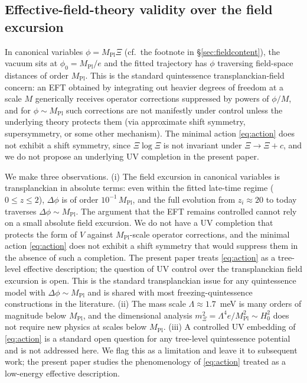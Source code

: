 \documentclass[11pt,reqno]{amsart}
\theoremstyle{plain}
\theoremstyle{definition}
\theoremstyle{remark}
\newcommand{\Pl}{\mathrm{Pl}}
\begin{document}
\subsection{Effective-field-theory validity over the field
excursion}\label{sec:eft}

In canonical variables $\phi = M_\Pl \Xi$ (cf.\ the footnote in
\S\ref{sec:fieldcontent}), the vacuum sits at $\phi_0 = M_\Pl/e$ and
the fitted trajectory has $\phi$ traversing field-space distances of
order $M_\Pl$. This is the standard quintessence transplanckian-field
concern: an EFT obtained by integrating out heavier degrees of freedom
at a scale $M$ generically receives operator corrections suppressed by
powers of $\phi/M$, and for $\phi \sim M_\Pl$ such corrections are not
manifestly under control unless the underlying theory protects them
(via approximate shift symmetry, supersymmetry, or some other
mechanism). The minimal action \eqref{eq:action} does not exhibit a
shift symmetry, since $\Xi\log\Xi$ is not invariant under
$\Xi \to \Xi + c$, and we do not propose an underlying UV completion in
the present paper.

We make three observations. (i) The field excursion in canonical
variables is transplanckian in absolute terms: even within the
fitted late-time regime ($0 \le z \le 2$), $\Delta\phi$ is of order
$10^{-1}\,M_\Pl$, and the full evolution from $z_i \approx 20$
to today traverses $\Delta\phi \sim M_\Pl$. The argument that the
EFT remains controlled cannot rely on a small absolute field
excursion. We do not have a UV completion that protects the form
of $V$ against $M_\Pl$-scale operator corrections, and the minimal
action \eqref{eq:action} does not exhibit a shift symmetry that
would suppress them in the absence of such a completion. The
present paper treats \eqref{eq:action} as a tree-level effective
description; the question of UV control over the transplanckian
field excursion is open. This is the standard transplanckian
issue for any quintessence model with $\Delta\phi \sim M_\Pl$ and
is shared with most freezing-quintessence constructions in the
literature.
(ii) The mass scale $\Lambda \approx 1.7$~meV is many
orders of magnitude below $M_\Pl$, and the dimensional analysis
$m_\Xi^{2} = \Lambda^{4} e / M_\Pl^{2} \sim H_0^{2}$ does not require
new physics at scales below $M_\Pl$. (iii) A controlled UV embedding
of \eqref{eq:action} is a standard open question for any tree-level
quintessence potential and is not addressed here. We flag this as a
limitation and leave it to subsequent work; the present paper studies
the phenomenology of \eqref{eq:action} treated as a low-energy
effective description.
\end{document}
